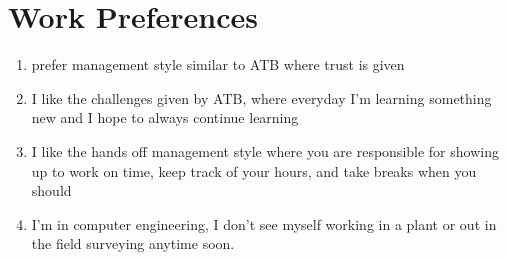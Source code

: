 \documentclass[letterpaper,12pt]{article}
\begin{document}
\section{Work Preferences}

\begin{enumerate}
  \item prefer management style similar to ATB where trust is given
  \item I like the challenges given by ATB, where everyday I'm learning something new and I hope
        to always continue learning
  \item I like the hands off management style where you are responsible for showing up to work on time, keep track of your hours,
        and take breaks when you should
  \item I'm in computer engineering, I don't see myself working in a plant or out in the field surveying anytime soon.
\end{enumerate}


\nocite{*}

\end{document}
